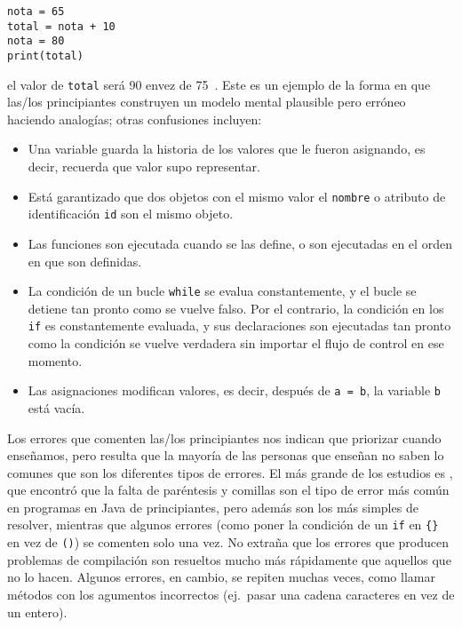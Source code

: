\begin{verbatim}
nota = 65
total = nota + 10
nota = 80
print(total)
\end{verbatim}

\noindent
el valor de \texttt{total} será 90 envez de 75~\cite{Kohn2017}.
Este es un ejemplo de la forma en que las/los principiantes construyen un modelo 
mental plausible pero erróneo haciendo analogías; otras confusiones incluyen:


\begin{itemize}

\item
  Una variable guarda la historia de los valores que le fueron asignando,
  es decir, recuerda que valor supo representar.

\item
  Está garantizado que dos objetos con el mismo valor el \texttt{nombre} 
  o atributo de identificación \texttt{id} son el mismo objeto.   
  

\item
  Las funciones son ejecutada cuando se las define,
  o son ejecutadas en el orden en que son definidas.

\item
  La condición de un bucle \texttt{while} se evalua constantemente,
  y el bucle se detiene tan pronto como se vuelve falso.
  Por el contrario,
  la condición en los \texttt{if} es constantemente evaluada,
  y sus declaraciones son ejecutadas tan pronto como la condición se vuelve verdadera
  sin importar el flujo de control en ese momento.

\item
  Las asignaciones modifican valores,
  es decir, después de \texttt{a\ =\ b}, la variable \texttt{b} está vacía.

\end{itemize}


Los errores que comenten las/los principiantes nos indican que priorizar cuando enseñamos,
pero resulta que la mayoría de las personas que enseñan no saben lo comunes que son los diferentes tipos de errores.
El más grande de los estudios es \cite{Brow2017},
que encontró que la falta de paréntesis y comillas son el tipo de error más común en programas en Java de principiantes,
pero además son los más simples de resolver,
mientras que algunos errores (como poner la condición de un \texttt{if} en \texttt{\{\}} en vez de \texttt{()})
se comenten solo una vez.
No extraña que los errores que producen problemas de compilación son resueltos mucho más rápidamente
que aquellos que no lo hacen.
Algunos errores, en cambio, se repiten muchas veces, como llamar métodos con los agumentos incorrectos
(ej.\ pasar una cadena caracteres en vez de un entero).

